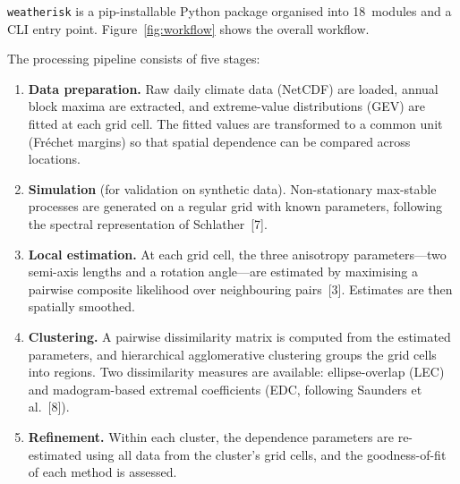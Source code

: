 \documentclass[preprint,12pt,a4paper]{elsarticle}
\begin{document}
\texttt{weatherisk} is a pip-installable Python package organised
into 18~modules and a CLI entry point.  Figure~\ref{fig:workflow}
shows the overall workflow.

The processing pipeline consists of five stages:
\begin{enumerate}
\item \textbf{Data preparation.}
  Raw daily climate data (NetCDF) are loaded, annual block maxima are
  extracted, and extreme-value distributions (GEV) are fitted at each
  grid cell.  The fitted values are transformed to a common unit
  (Fr\'{e}chet margins) so that spatial dependence can be compared
  across locations.
\item \textbf{Simulation} (for validation on synthetic data).
  Non-stationary max-stable processes are generated on a regular grid
  with known parameters, following the spectral
  representation of Schlather~[7].
\item \textbf{Local estimation.}
  At each grid cell, the three anisotropy parameters---two semi-axis
  lengths and a rotation angle---are estimated by maximising a
  pairwise composite likelihood over neighbouring pairs~[3].
  Estimates are then spatially smoothed.
\item \textbf{Clustering.}
  A pairwise dissimilarity matrix is computed from the estimated
  parameters, and hierarchical agglomerative clustering groups the
  grid cells into regions.  Two dissimilarity measures are available:
  ellipse-overlap (LEC) and madogram-based extremal coefficients
  (EDC, following Saunders et al.~[8]).
\item \textbf{Refinement.}
  Within each cluster, the dependence parameters are re-estimated
  using all data from the cluster's grid cells, and the
  goodness-of-fit of each method is assessed.
\end{enumerate}
\end{document}
